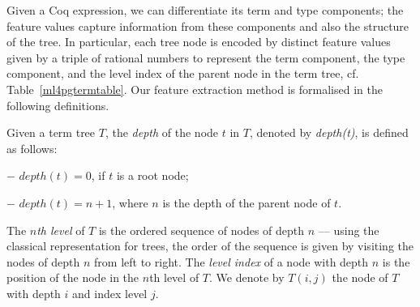 Given a Coq expression, we can differentiate its term and type components; the feature values capture information from
these components and also the structure of the tree. In particular, each tree node is encoded by distinct feature values
given by a triple of rational numbers to represent the term component, the type component, and the level index of the parent node in the term tree,
cf. Table~\ref{ml4pgtermtable}. Our feature extraction method is formalised in the following definitions.

\begin{table}[t]
\end{table}


\begin{definition}\label{def:termtreelevel}
Given  a term tree $T$, the \emph{depth} of the node $t$ in $T$, denoted by \emph{depth(t)}, is defined as follows:

$-$ $depth(t) = 0$, if $t$ is a root node;

$-$ $depth(t) = n+1$, where $n$ is the depth of the parent node of $t$.

The \emph{$n$th level} of $T$ is the ordered sequence of nodes of depth $n$ --- using the classical representation for trees, the order of the sequence is
given by visiting the nodes of depth $n$ from left to right. The \emph{level index} of a node with depth $n$ is the position of the node in the $n$th level of $T$.
We denote by $T(i,j)$ the node of $T$ with depth $i$ and index level $j$.
\end{definition}

